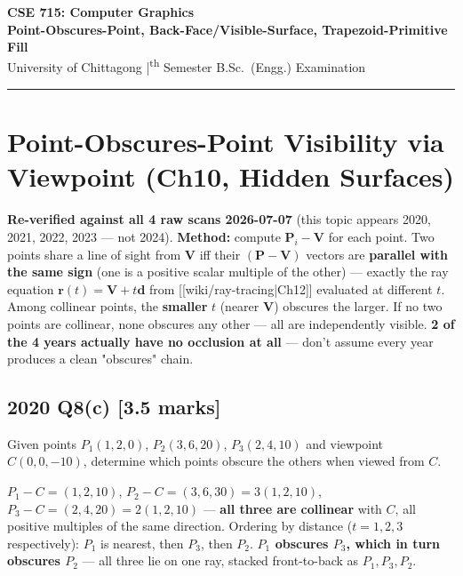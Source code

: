 \documentclass[12pt, a4paper]{article}
\newenvironment{solutionbox}{\begin{mdframed}[style=solutionframe]}{\end{mdframed}}
\newenvironment{answerbox}{\begin{mdframed}[style=answerframe]}{\end{mdframed}}
\newenvironment{notesbox}{\begin{mdframed}[style=notesframe]}{\end{mdframed}}
\begin{document}
\begin{center}
  {\LARGE\bfseries\color{sectionblue} CSE 715: Computer Graphics}\\[0.6em]
  {\Large\bfseries Point-Obscures-Point, Back-Face/Visible-Surface, Trapezoid-Primitive Fill}\\[0.3em]
  {\normalsize University of Chittagong \quad|\textsuperscript{th} Semester B.Sc.\ (Engg.) Examination}
\end{center}

\vspace{0.3em}\noindent\rule{\linewidth}{1pt}\vspace{0.5em}

\tableofcontents
\newpage

\section{Point-Obscures-Point Visibility via Viewpoint (Ch10, Hidden Surfaces)}
\begin{notesbox}
\textbf{Re-verified against all 4 raw scans 2026-07-07} (this topic appears 2020, 2021, 2022, 2023 — not 2024). \textbf{Method:} compute $\mathbf{P}_i-\mathbf{V}$ for each point. Two points share a line of sight from $\mathbf{V}$ iff their $(\mathbf{P}-\mathbf{V})$ vectors are \textbf{parallel with the same sign} (one is a positive scalar multiple of the other) --- exactly the ray equation $\mathbf{r}(t)=\mathbf{V}+t\mathbf{d}$ from [[wiki/ray-tracing|Ch12]] evaluated at different $t$. Among collinear points, the \textbf{smaller} $t$ (nearer $\mathbf{V}$) obscures the larger. If no two points are collinear, none obscures any other --- all are independently visible. \textbf{2 of the 4 years actually have no occlusion at all} --- don't assume every year produces a clean "obscures" chain.
\end{notesbox}

\subsection*{2020 Q8(c) [3.5 marks]}
\begin{solutionbox}
Given points $P_1(1,2,0)$, $P_2(3,6,20)$, $P_3(2,4,10)$ and viewpoint $C(0,0,-10)$, determine which points obscure the others when viewed from $C$.
\end{solutionbox}
\begin{answerbox}
$P_1-C=(1,2,10)$, $P_2-C=(3,6,30)=3(1,2,10)$, $P_3-C=(2,4,20)=2(1,2,10)$ --- \textbf{all three are collinear} with $C$, all positive multiples of the same direction. Ordering by distance ($t=1,2,3$ respectively): $P_1$ is nearest, then $P_3$, then $P_2$. \textbf{$P_1$ obscures $P_3$, which in turn obscures $P_2$} --- all three lie on one ray, stacked front-to-back as $P_1,P_3,P_2$.
\end{answerbox}
\end{document}
